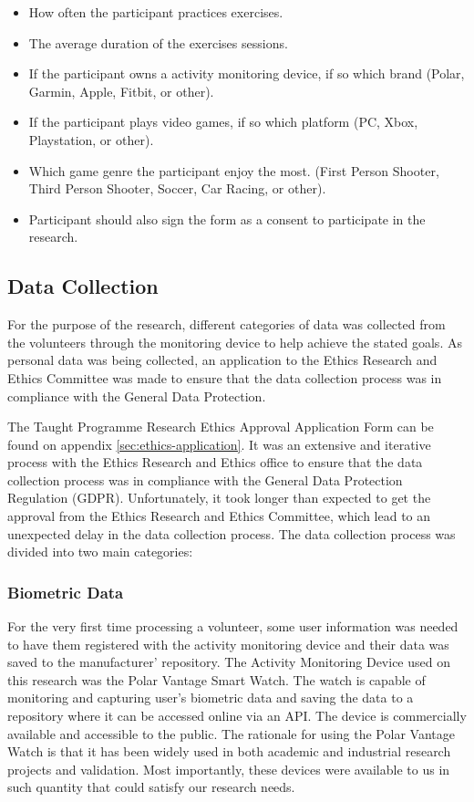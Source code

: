 \begin{itemize}
    \item How often the participant practices exercises.
    \item The average duration of the exercises sessions.
    \item If the participant owns a activity monitoring device, if so which brand (Polar, Garmin, Apple, Fitbit, or other).
    \item If the participant plays video games, if so which platform (PC, Xbox, Playstation, or other).
    \item Which game genre the participant enjoy the most. (First Person Shooter, Third Person Shooter, Soccer, Car Racing, or other).
    \item Participant should also sign the form as a consent to participate in the research.
\end{itemize}


\subsection{Data Collection}

For the purpose of the research, different categories of data was collected from the volunteers through the monitoring device to help achieve the stated goals. As personal data was
being collected, an application to the Ethics Research and Ethics Committee was made to ensure that the data collection process was in compliance with the General Data Protection.

\par 
The Taught Programme Research Ethics Approval Application Form can be found on appendix \ref{sec:ethics-application}. It was an extensive and iterative process with the Ethics Research and Ethics 
office to ensure that the data collection process was in compliance with the General Data Protection Regulation (GDPR). Unfortunately, it took longer than expected to get the approval
from the Ethics Research and Ethics Committee, which lead to an unexpected delay in the data collection process. The data collection process was divided into two main categories:

\subsubsection*{Biometric Data}

For the very first time processing a volunteer, some user information was needed to have them registered with the activity monitoring device and their data was saved to the manufacturer'
repository. The Activity Monitoring Device used on this research was the Polar Vantage Smart Watch. The watch is capable of monitoring and capturing user’s biometric data and saving the
data to a repository where it can be accessed online via an API. The device is commercially available and accessible to the public. The rationale for using the Polar Vantage Watch is
that it has been widely used in both academic and industrial research projects and validation. Most importantly, these devices were available to us in such quantity that could satisfy
our research needs.


